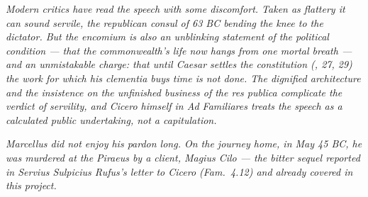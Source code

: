 \textit{Modern critics have read the speech with some
discomfort. Taken as flattery it can sound servile, the
republican consul of 63 BC bending the knee to the
dictator. But the encomium is also an unblinking statement
of the political condition --- that the commonwealth's life
now hangs from one mortal breath --- and an unmistakable
charge: that until Caesar settles the constitution
(, 27, 29) the work for which his
\textit{clementia} buys time is not done. The dignified
architecture and the insistence on the unfinished business
of the \textit{res publica} complicate the verdict of
servility, and Cicero himself in \textit{Ad Familiares}
treats the speech as a calculated public undertaking, not a
capitulation.}

\textit{Marcellus did not enjoy his pardon long. On the
journey home, in May 45 BC, he was murdered at the Piraeus
by a client, Magius Cilo --- the bitter sequel reported in
Servius Sulpicius Rufus's letter to Cicero (Fam.~4.12) and
already covered in this project.}
